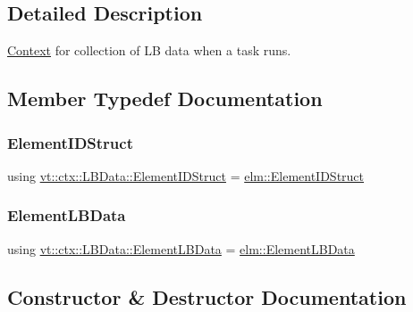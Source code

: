 \subsection{Detailed Description}
\hyperlink{structvt_1_1ctx_1_1_context}{Context} for collection of LB data when a task runs. 

\subsection{Member Typedef Documentation}
\mbox{\label{structvt_1_1ctx_1_1_l_b_data_aad9fac05c3faf80173b273d900db6fb1}} 
\subsubsection{\texorpdfstring{Element\+I\+D\+Struct}{ElementIDStruct}}
{\footnotesize\ttfamily using \hyperlink{structvt_1_1ctx_1_1_l_b_data_aad9fac05c3faf80173b273d900db6fb1}{vt\+::ctx\+::\+L\+B\+Data\+::\+Element\+I\+D\+Struct} =  \hyperlink{structvt_1_1elm_1_1_element_i_d_struct}{elm\+::\+Element\+I\+D\+Struct}}

\mbox{\label{structvt_1_1ctx_1_1_l_b_data_a11f1aeb75c01ae0c77d96f94ce1994bb}} 
\subsubsection{\texorpdfstring{Element\+L\+B\+Data}{ElementLBData}}
{\footnotesize\ttfamily using \hyperlink{structvt_1_1ctx_1_1_l_b_data_a11f1aeb75c01ae0c77d96f94ce1994bb}{vt\+::ctx\+::\+L\+B\+Data\+::\+Element\+L\+B\+Data} =  \hyperlink{structvt_1_1elm_1_1_element_l_b_data}{elm\+::\+Element\+L\+B\+Data}}



\subsection{Constructor \& Destructor Documentation}
\mbox{\label{structvt_1_1ctx_1_1_l_b_data_a2df28bac4813faec6857a0df13692e09}} 
